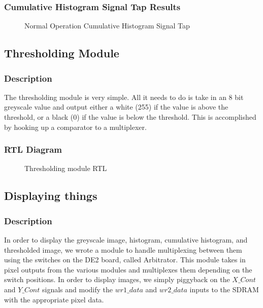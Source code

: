 \documentclass[12pt]{article}
\begin{document}
  \subsubsection{Cumulative Histogram Signal Tap Results}
  \begin{figure}[H]
    \caption{Normal Operation Cumulative Histogram Signal Tap}
    \label{fig:cumulative_histogram_signal_tap_normal_operation}
  \end{figure}

  \subsection{Thresholding Module}
  \subsubsection{Description}
  The thresholding module is very simple. All it needs to do is take in an 8 bit greyscale value and output either a white (255) if the value is above the threshold, or a black (0) if the value is below the threshold. This is accomplished by hooking up a comparator to a multiplexer.
  
  \subsubsection{RTL Diagram}
  \begin{figure}[H]
    \caption{Thresholding module RTL}
    \label{fig:thresholder_rtl}
  \end{figure}
  
  
  \subsection{Displaying things}
  \subsubsection{Description}
  In order to display the greyscale image, histogram, cumulative histogram, and thresholded image, we wrote a module to handle multiplexing between them using the switches on the DE2 board, called Arbitrator. This module takes in pixel outputs from the various modules and multiplexes them depending on the switch positions. In order to display images, we simply piggyback on the \(X\_Cont\) and \(Y\_Cont\) signals and modify the \(wr1\_data\) and \(wr2\_data\) inputs to the SDRAM with the appropriate pixel data. \\
      
\end{document}
